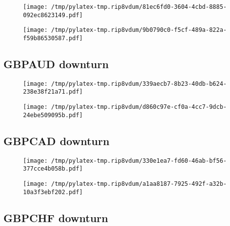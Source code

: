 \documentclass{article}%
\begin{document}
\begin{figure}[htbp]%
\centering%
\texttt{[image: /tmp/pylatex-tmp.rip8vdum/81ec6fd0-3604-4cbd-8885-092ec8623149.pdf]}%
\end{figure}

%


\begin{figure}[htbp]%
\centering%
\texttt{[image: /tmp/pylatex-tmp.rip8vdum/9b0790c0-f5cf-489a-822a-f59b86530587.pdf]}%
\end{figure}

%
\newpage %
\subsection{GBPAUD downturn}%
\label{subsec:GBPAUDdownturn}%


\begin{figure}[htbp]%
\centering%
\texttt{[image: /tmp/pylatex-tmp.rip8vdum/339aecb7-8b23-40db-b624-238e38f21a71.pdf]}%
\end{figure}

%


\begin{figure}[htbp]%
\centering%
\texttt{[image: /tmp/pylatex-tmp.rip8vdum/d860c97e-cf0a-4cc7-9dcb-24ebe509095b.pdf]}%
\end{figure}

%
\newpage %
\subsection{GBPCAD downturn}%
\label{subsec:GBPCADdownturn}%


\begin{figure}[htbp]%
\centering%
\texttt{[image: /tmp/pylatex-tmp.rip8vdum/330e1ea7-fd60-46ab-bf56-377cce4b058b.pdf]}%
\end{figure}

%


\begin{figure}[htbp]%
\centering%
\texttt{[image: /tmp/pylatex-tmp.rip8vdum/a1aa8187-7925-492f-a32b-10a3f3ebf202.pdf]}%
\end{figure}

%
\newpage %
\subsection{GBPCHF downturn}%
\label{subsec:GBPCHFdownturn}%
\end{document}
